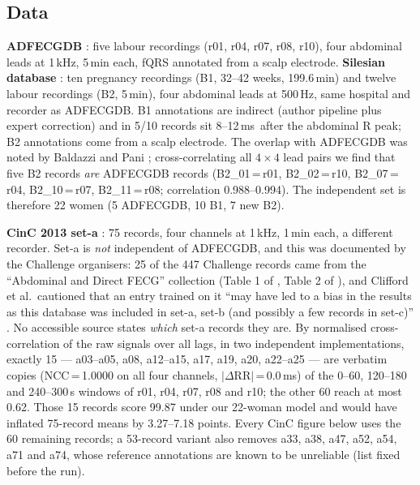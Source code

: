 \documentclass[10pt,twocolumn,a4paper]{article}
\newcommand{\ms}{\,ms}
\begin{document}
\subsection{Data}
\textbf{ADFECGDB} \cite{goldberger2000}: five labour recordings (r01, r04, r07, r08, r10), four
abdominal leads at 1\,kHz, 5\,min each, fQRS annotated from a scalp electrode.
\textbf{Silesian database} \cite{matonia2020}: ten pregnancy recordings (B1, 32--42 weeks,
199.6\,min) and twelve labour recordings (B2, 5\,min), four abdominal leads at 500\,Hz, same hospital
and recorder as ADFECGDB. B1 annotations are indirect (author pipeline plus expert correction) and
in 5/10 records sit 8--12\ms\ after the abdominal R peak; B2 annotations come from a scalp electrode.
The overlap with ADFECGDB was noted by Baldazzi and Pani \cite{baldazzi2023}; cross-correlating all
$4\times4$ lead pairs we find that five B2 records \emph{are} ADFECGDB records (B2\_01\,=\,r01,
B2\_02\,=\,r10, B2\_07\,=\,r04, B2\_10\,=\,r07, B2\_11\,=\,r08; correlation 0.988--0.994). The
independent set is therefore 22 women (5 ADFECGDB, 10 B1, 7 new B2).

\textbf{CinC 2013 set-a} \cite{silva2013,clifford2014}: 75 records, four channels at 1\,kHz, 1\,min
each, a different recorder. Set-a is \emph{not} independent of ADFECGDB, and this was documented by
the Challenge organisers: 25 of the 447 Challenge records came from the ``Abdominal and Direct FECG''
collection (Table 1 of \cite{silva2013}, Table 2 of \cite{clifford2014}), and Clifford et al.\ cautioned
that an entry trained on it ``may have led to a bias in the results as this database was included in
set-a, set-b (and possibly a few records in set-c)'' \cite{clifford2014}. No accessible source states
\emph{which} set-a records they are. By normalised cross-correlation of the raw signals over all lags,
in two independent implementations, exactly 15 --- a03--a05, a08, a12--a15, a17, a19, a20, a22--a25 ---
are verbatim copies (NCC\,=\,1.0000 on all four channels, $|\Delta\mathrm{RR}|$\,=\,0.0\ms) of the
0--60, 120--180 and 240--300\,s windows of r01, r04, r07, r08 and r10; the other 60 reach at most 0.62.
Those 15 records score 99.87 under our 22-woman model and would have inflated 75-record means by
3.27--7.18 points. Every CinC figure below uses the 60 remaining records; a 53-record variant also
removes a33, a38, a47, a52, a54, a71 and a74, whose reference annotations are known to be unreliable
\cite{behar2014} (list fixed before the run).
\end{document}
